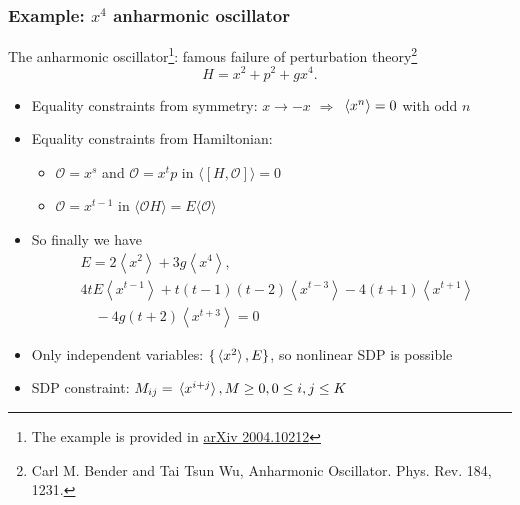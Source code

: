 \documentclass{beamer}
\begin{document}
\begin{frame}
\frametitle{Example: $x^4$ anharmonic oscillator}

The anharmonic oscillator\footnote{The example is provided in \href{https://arxiv.org/abs/2004.10212}{arXiv 2004.10212}}: famous failure of perturbation theory\footnote{Carl M. Bender and Tai Tsun Wu, Anharmonic Oscillator. Phys. Rev. 184, 1231.}
\begin{equation}
    H = x^2 + p^2 + g x^4.
\end{equation}

\begin{itemize}
    \item Equality constraints from symmetry: $x \to -x$ $\Rightarrow$ $\expval*{x^n} = 0$ with odd $n$
    \item Equality constraints from Hamiltonian:
    \begin{itemize}
        \item $\mathcal{O}=x^{s}$ and $\mathcal{O}=x^{t} p$ in $\langle[H, \mathcal{O}]\rangle=0$ 
        \item $\mathcal{O}=x^{t-1}$ in $\langle\mathcal{O} H\rangle=E\langle\mathcal{O}\rangle$
    \end{itemize}
    \item So finally we have
        \begin{equation}
            \begin{aligned}
                &E=2\left\langle x^{2}\right\rangle+3 g\left\langle x^{4}\right\rangle, \\
                &4 t E\left\langle x^{t-1}\right\rangle +t(t-1)(t-2)\left\langle x^{t-3}\right\rangle -4(t+1)\left\langle x^{t+1}\right\rangle \\
                &\quad -4 g(t+2)\left\langle x^{t+3}\right\rangle=0 
            \end{aligned}
        \end{equation}
    \item Only independent variables: $\{\expval*{x^2}, E\}$, so nonlinear SDP is possible
    \item SDP constraint: $M_{ij} = \expval*{x^{i+j}}, M \geq 0, 0 \leq i, j \leq K$
\end{itemize}

\end{frame}
\end{document}
